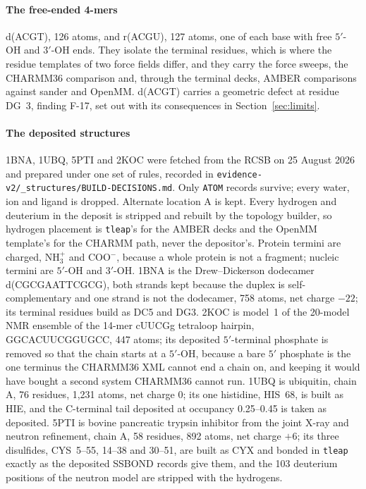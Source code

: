 \paragraph{The free-ended 4-mers}
d(ACGT), 126 atoms, and r(ACGU), 127 atoms, one of each base with free $5'$-OH
and $3'$-OH ends. They isolate the terminal residues, which is where the residue
templates of two force fields differ, and they carry the force sweeps, the
CHARMM36 comparison and, through the terminal decks, AMBER comparisons against
sander and OpenMM. d(ACGT) carries a geometric defect at residue DG~3, finding
F-17, set out with its consequences in Section~\ref{sec:limits}.

\paragraph{The deposited structures}
1BNA, 1UBQ, 5PTI and 2KOC were fetched from the RCSB on 25 August 2026 and
prepared under one set of rules, recorded in
\texttt{evidence-v2/\_structures/BUILD-DECISIONS.md}. Only \texttt{ATOM}
records survive; every water, ion and ligand is dropped. Alternate location A
is kept. Every hydrogen and deuterium in the deposit is stripped and rebuilt by
the topology builder, so hydrogen placement is \texttt{tleap}'s for the AMBER
decks and the OpenMM template's for the CHARMM path, never the depositor's.
Protein termini are charged, NH$_3^+$ and COO$^-$, because a whole protein is
not a fragment; nucleic termini are $5'$-OH and $3'$-OH. 1BNA is the
Drew--Dickerson dodecamer d(CGCGAATTCGCG)\cite{pdb1bna}, both strands kept
because the duplex is self-complementary and one strand is not the dodecamer,
758 atoms, net charge $-22$; its terminal residues build as DC5 and DG3. 2KOC
is model~1 of the 20-model NMR ensemble of the 14-mer cUUCGg tetraloop
hairpin\cite{pdb2koc}, GGCACUUCGGUGCC, 447 atoms; its deposited $5'$-terminal
phosphate is removed so that the chain starts at a $5'$-OH, because a bare
$5'$ phosphate is the one terminus the CHARMM36 XML cannot end a chain on, and
keeping it would have bought a second system CHARMM36 cannot run. 1UBQ is
ubiquitin\cite{pdb1ubq}, chain A, 76 residues, 1,231 atoms, net charge 0; its
one histidine, HIS~68, is built as HIE, and the C-terminal tail deposited at
occupancy 0.25--0.45 is taken as deposited. 5PTI is bovine pancreatic trypsin
inhibitor from the joint X-ray and neutron refinement\cite{pdb5pti}, chain A,
58 residues, 892 atoms, net charge $+6$; its three disulfides, CYS~5--55,
14--38 and 30--51, are built as CYX and bonded in \texttt{tleap} exactly as the
deposited SSBOND records give them, and the 103 deuterium positions of the
neutron model are stripped with the hydrogens.

